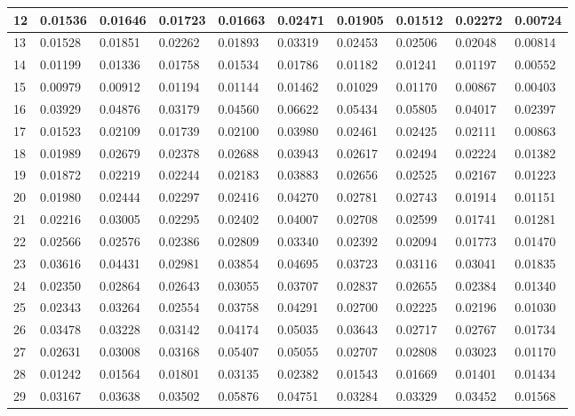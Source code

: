 \begin{table}[H]
{\begin{tabular}{|l|l|l|l|l|l|l|l|l|l|}
        12 & 0.01536 & 0.01646 & 0.01723 & 0.01663 & 0.02471 & 0.01905 & 0.01512 & 0.02272 & 0.00724 \\ \hline
        13 & 0.01528 & 0.01851 & 0.02262 & 0.01893 & 0.03319 & 0.02453 & 0.02506 & 0.02048 & 0.00814 \\ \hline
        14 & 0.01199 & 0.01336 & 0.01758 & 0.01534 & 0.01786 & 0.01182 & 0.01241 & 0.01197 & 0.00552 \\ \hline
        15 & 0.00979 & 0.00912 & 0.01194 & 0.01144 & 0.01462 & 0.01029 & 0.01170 & 0.00867 & 0.00403 \\ \hline
        16 & 0.03929 & 0.04876 & 0.03179 & 0.04560 & 0.06622 & 0.05434 & 0.05805 & 0.04017 & 0.02397 \\ \hline
        17 & 0.01523 & 0.02109 & 0.01739 & 0.02100 & 0.03980 & 0.02461 & 0.02425 & 0.02111 & 0.00863 \\ \hline
        18 & 0.01989 & 0.02679 & 0.02378 & 0.02688 & 0.03943 & 0.02617 & 0.02494 & 0.02224 & 0.01382 \\ \hline
        19 & 0.01872 & 0.02219 & 0.02244 & 0.02183 & 0.03883 & 0.02656 & 0.02525 & 0.02167 & 0.01223 \\ \hline
        20 & 0.01980 & 0.02444 & 0.02297 & 0.02416 & 0.04270 & 0.02781 & 0.02743 & 0.01914 & 0.01151 \\ \hline
        21 & 0.02216 & 0.03005 & 0.02295 & 0.02402 & 0.04007 & 0.02708 & 0.02599 & 0.01741 & 0.01281 \\ \hline
        22 & 0.02566 & 0.02576 & 0.02386 & 0.02809 & 0.03340 & 0.02392 & 0.02094 & 0.01773 & 0.01470 \\ \hline
        23 & 0.03616 & 0.04431 & 0.02981 & 0.03854 & 0.04695 & 0.03723 & 0.03116 & 0.03041 & 0.01835 \\ \hline
        24 & 0.02350 & 0.02864 & 0.02643 & 0.03055 & 0.03707 & 0.02837 & 0.02655 & 0.02384 & 0.01340 \\ \hline
        25 & 0.02343 & 0.03264 & 0.02554 & 0.03758 & 0.04291 & 0.02700 & 0.02225 & 0.02196 & 0.01030 \\ \hline
        26 & 0.03478 & 0.03228 & 0.03142 & 0.04174 & 0.05035 & 0.03643 & 0.02717 & 0.02767 & 0.01734 \\ \hline
        27 & 0.02631 & 0.03008 & 0.03168 & 0.05407 & 0.05055 & 0.02707 & 0.02808 & 0.03023 & 0.01170 \\ \hline
        28 & 0.01242 & 0.01564 & 0.01801 & 0.03135 & 0.02382 & 0.01543 & 0.01669 & 0.01401 & 0.01434 \\ \hline
        29 & 0.03167 & 0.03638 & 0.03502 & 0.05876 & 0.04751 & 0.03284 & 0.03329 & 0.03452 & 0.01568 \\ \hline

\end{tabular}}
\end{table}
